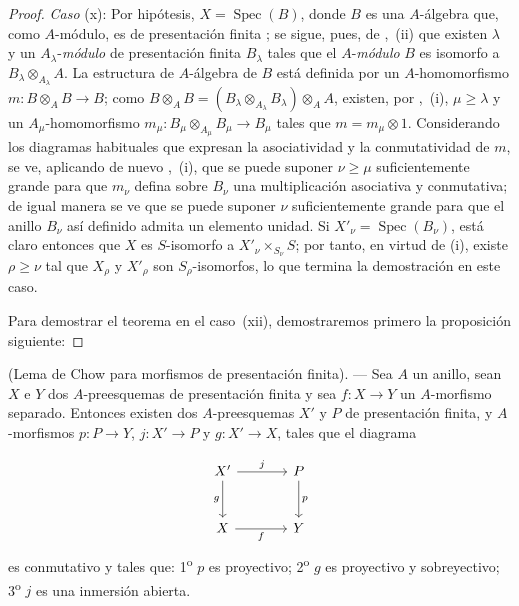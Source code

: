 \begin{proof}
\emph{Caso} (x): Por hipótesis, $X=\operatorname{Spec}(B)$, donde $B$ es una $A$-álgebra que, como $A$-módulo, es de presentación finita ; se sigue, pues, de ,~(ii) que existen $\lambda$ y un $A_\lambda$-\emph{módulo} de presentación finita $B_\lambda$ tales que el $A$-\emph{módulo} $B$ es isomorfo a $B_\lambda\otimes_{A_\lambda}A$.
La estructura de $A$-álgebra de $B$ está definida por un $A$-homomorfismo $m:B\otimes_AB\to B$; como $B\otimes_AB=(B_\lambda\otimes_{A_\lambda}B_\lambda)\otimes_AA$, existen, por ,~(i), $\mu\geq\lambda$ y un $A_\mu$-homomorfismo $m_\mu:B_\mu\otimes_{A_\mu}B_\mu\to B_\mu$ tales que $m=m_\mu\otimes1$.
Considerando los diagramas habituales que expresan la asociatividad y la conmutatividad de $m$, se ve, aplicando de nuevo ,~(i), que se puede suponer $\nu\geq\mu$ suficientemente grande para que $m_\nu$ defina sobre $B_\nu$ una multiplicación asociativa y conmutativa; de igual manera se ve que se puede suponer $\nu$ suficientemente grande para que el anillo $B_\nu$ así definido admita un elemento unidad.
Si $X'_\nu=\operatorname{Spec}(B_\nu)$, está claro entonces que $X$ es $S$-isomorfo a $X'_\nu\times_{S_\nu}S$; por tanto, en virtud de (i), existe $\rho\geq\nu$ tal que $X_\rho$ y $X'_\rho$ son $S_\rho$-isomorfos, lo que termina la demostración en este caso.

Para demostrar el teorema en el caso~(xii), demostraremos primero la proposición siguiente:
\end{proof}

\begin{proposition}[8.10.5.1]
\label{IV.8.10.5.1-fr}
(Lema de Chow para morfismos de presentación finita). --- Sea $A$ un anillo, sean $X$ e $Y$ dos $A$-preesquemas de presentación finita y sea $f:X\to Y$
un $A$-morfismo separado. Entonces existen dos $A$-preesquemas $X'$ y $P$ de presentación finita, y $A$-morfismos $p:P\to Y$, $j:X'\to P$ y $g:X'\to X$, tales que el diagrama

\[
\begin{tikzcd}[column sep=large,row sep=large]
X' \arrow[r,"j"] \arrow[d,"g"'] & P \arrow[d,"p"] \\
X \arrow[r,"f"'] & Y
\end{tikzcd}
\]
es conmutativo y tales que: 1\textsuperscript{o} $p$ es proyectivo; 2\textsuperscript{o} $g$ es proyectivo y sobreyectivo; 3\textsuperscript{o} $j$ es una inmersión abierta.
\end{proposition}


